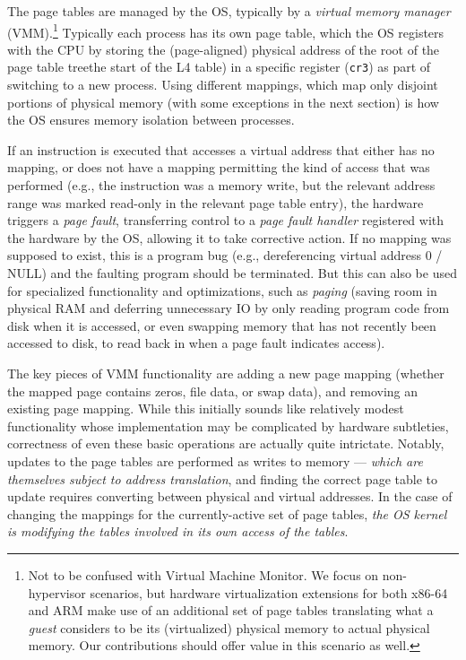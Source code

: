 The page tables are managed by the OS, typically by a \emph{virtual memory manager} (VMM).\footnote{Not to be confused with Virtual 
Machine Monitor. We focus on non-hypervisor scenarios, but hardware virtualization extensions for both 
x86-64 and ARM make use of an additional set of page tables translating what a \emph{guest} considers to be its 
(virtualized) physical memory to actual physical memory. Our contributions should offer value in this scenario as well.}
Typically each process has its own 
page table, which the OS registers with the CPU by storing the (page-aligned)
physical address of the root of the page table treethe start of the L4 table) in a 
specific register (\texttt{cr3}) as part of switching to a new process. 
Using different mappings, which map only disjoint portions of physical memory (with some exceptions in the next section) 
is how the OS ensures memory isolation between processes.

If an instruction is executed that accesses a virtual address that either has no mapping, or does not have a mapping permitting 
the kind of access that was performed (e.g., the instruction was a memory write, but the relevant address range was marked read-only in
the relevant page table entry), the hardware triggers a \emph{page fault}, transferring control to a \emph{page fault handler} registered 
with the hardware by the OS, allowing it to take corrective action.
If no mapping was supposed to exist, this is a program bug (e.g., dereferencing virtual address 0 / NULL)
and the faulting program should be terminated. But this can also be used for
specialized functionality and optimizations, such as \emph{paging} (saving room in physical RAM and deferring
unnecessary IO by only reading program code from disk when it is accessed, or even swapping memory that has not
recently been accessed to disk, to read back in when a page fault indicates access).

The key pieces of VMM functionality are
adding a new page mapping (whether the mapped page contains zeros, file data, or swap data), and removing an existing 
page mapping.
While this initially sounds like relatively modest functionality whose implementation may be complicated by hardware 
subtleties, correctness of even these basic operations are actually quite intrictate.
Notably, updates to the page tables are performed as writes to memory --- \emph{which are themselves subject to address translation},
and finding the correct page table to update requires converting between physical and virtual addresses.
In the case of changing the mappings for the currently-active set of page tables, 
\emph{the OS kernel is modifying the tables involved in its
own access of the tables}.

